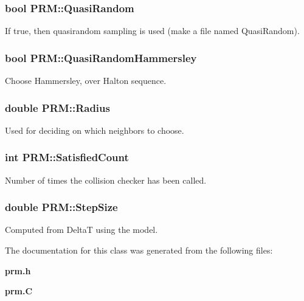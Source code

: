 \subsubsection{\setlength{\rightskip}{0pt plus 5cm}bool PRM::Quasi\-Random}\label{classPRM_m2}


If true, then quasirandom sampling is used (make a file named Quasi\-Random).

\subsubsection{\setlength{\rightskip}{0pt plus 5cm}bool PRM::Quasi\-Random\-Hammersley}\label{classPRM_m3}


Choose Hammersley, over Halton sequence.

\subsubsection{\setlength{\rightskip}{0pt plus 5cm}double PRM::Radius}\label{classPRM_m0}


Used for deciding on which neighbors to choose.

\subsubsection{\setlength{\rightskip}{0pt plus 5cm}int PRM::Satisfied\-Count}\label{classPRM_m1}


Number of times the collision checker has been called.

\subsubsection{\setlength{\rightskip}{0pt plus 5cm}double PRM::Step\-Size\hspace{0.3cm}{\tt  [protected]}}\label{classPRM_n0}


Computed from Delta\-T using the model.



The documentation for this class was generated from the following files:\begin{CompactItemize}
\item 
{\bf prm.h}\item 
{\bf prm.C}\end{CompactItemize}
